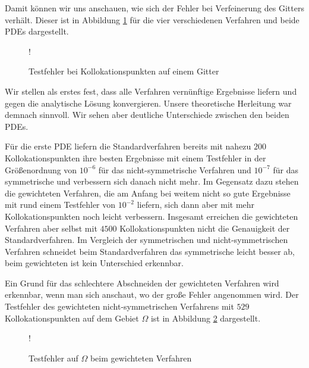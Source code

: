 Damit können wir uns anschauen, wie sich der Fehler bei Verfeinerung des Gitters verhält. Dieser ist in Abbildung \ref{fig:error-grid-both} für die vier verschiedenen Verfahren und beide \acp{PDE} dargestellt. 
%
\begin{figure}[ht]
\centering
\resizebox {\columnwidth} {!} {

}
\caption{Testfehler bei Kollokationspunkten auf einem Gitter}
\label{fig:error-grid-both}
\end{figure}

Wir stellen als erstes fest, dass alle Verfahren vernünftige Ergebnisse liefern und gegen die analytische Lösung konvergieren. Unsere theoretische Herleitung war demnach sinnvoll. Wir sehen aber deutliche Unterschiede zwischen den beiden \acp{PDE}.

Für die erste \ac{PDE} liefern die Standardverfahren bereits mit nahezu $200$ Kollokationspunkten ihre besten Ergebnisse mit einem Testfehler in der Größenordnung von $10^{-6}$ für das nicht-symmetrische Verfahren und $10^{-7}$ für das symmetrische und verbessern sich danach nicht mehr. Im Gegensatz dazu stehen die gewichteten Verfahren, die am Anfang bei weitem nicht so gute Ergebnisse mit rund einem Testfehler von $10^{-2}$ liefern, sich dann aber mit mehr Kollokationspunkten noch leicht verbessern. Insgesamt erreichen die gewichteten Verfahren aber selbst mit $4500$ Kollokationspunkten nicht die Genauigkeit der Standardverfahren. Im Vergleich der symmetrischen und nicht-symmetrischen Verfahren schneidet beim Standardverfahren das symmetrische leicht besser ab, beim gewichteten ist kein Unterschied erkennbar.

Ein Grund für das schlechtere Abschneiden der gewichteten Verfahren wird erkennbar, wenn man sich anschaut, wo der große Fehler angenommen wird. Der Testfehler des gewichteten nicht-symmetrischen Verfahrens mit $529$ Kollokationspunkten auf dem Gebiet $\Omega$ ist in Abbildung \ref{fig:Vergleich} dargestellt.

\begin{figure}[ht]
\centering
\resizebox {.7\columnwidth} {!} {

}
\caption{Testfehler auf $\Omega$ beim gewichteten Verfahren}
\label{fig:Vergleich}
\end{figure}

